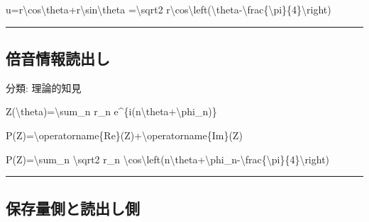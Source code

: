 \documentclass[
  a4paper]{ltjsarticle}
\newenvironment{Shaded}{}{}
\newcommand{\NormalTok}[1]{#1}
\begin{document}
\begin{Shaded}
\begin{Highlighting}[]
\NormalTok{u=r\textbackslash{}cos\textbackslash{}theta+r\textbackslash{}sin\textbackslash{}theta}
\NormalTok{=\textbackslash{}sqrt2 r\textbackslash{}cos\textbackslash{}left(\textbackslash{}theta{-}\textbackslash{}frac\{\textbackslash{}pi\}\{4\}\textbackslash{}right)}
\end{Highlighting}
\end{Shaded}

\begin{center}\rule{0.5\linewidth}{0.5pt}\end{center}

\subsection{倍音情報読出し}\label{ux500dux97f3ux60c5ux5831ux8aadux51faux3057}

分類: 理論的知見

\begin{Shaded}
\begin{Highlighting}[]
\NormalTok{Z(\textbackslash{}theta)=\textbackslash{}sum\_n r\_n e\^{}\{i(n\textbackslash{}theta+\textbackslash{}phi\_n)\}}
\end{Highlighting}
\end{Shaded}

\begin{Shaded}
\begin{Highlighting}[]
\NormalTok{P(Z)=\textbackslash{}operatorname\{Re\}(Z)+\textbackslash{}operatorname\{Im\}(Z)}
\end{Highlighting}
\end{Shaded}

\begin{Shaded}
\begin{Highlighting}[]
\NormalTok{P(Z)=\textbackslash{}sum\_n \textbackslash{}sqrt2 r\_n}
\NormalTok{\textbackslash{}cos\textbackslash{}left(n\textbackslash{}theta+\textbackslash{}phi\_n{-}\textbackslash{}frac\{\textbackslash{}pi\}\{4\}\textbackslash{}right)}
\end{Highlighting}
\end{Shaded}

\begin{center}\rule{0.5\linewidth}{0.5pt}\end{center}

\subsection{保存量側と読出し側}\label{ux4fddux5b58ux91cfux5074ux3068ux8aadux51faux3057ux5074}
\end{document}

